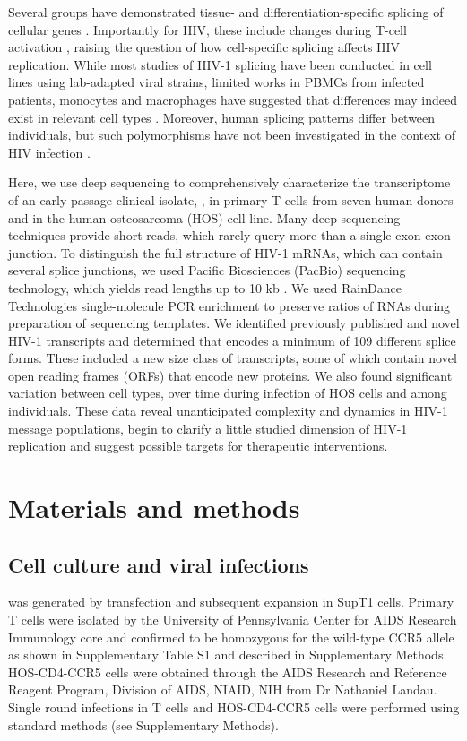 \documentclass[../sherrill-Mix_thesis.tex]{subfiles}
\begin{document}
Several groups have demonstrated tissue- and differentiation-specific splicing of cellular genes \citep{Wang2008,Grabowski2011,Llorian2011}. Importantly for HIV, these include changes during T-cell activation \citep{Ip2007,Topp2008}, raising the question of how cell-specific splicing affects HIV replication. While most studies of HIV-1 splicing have been conducted in cell lines using lab-adapted viral strains, limited works in PBMCs from infected patients, monocytes and macrophages have suggested that differences may indeed exist in relevant cell types \citep{Carrera2010,Saltarelli1996,Sonza2002,Dowling2008}. Moreover, human splicing patterns differ between individuals, but such polymorphisms have not been investigated in the context of HIV infection \citep{Hull2007,Kwan2007}.

Here, we use deep sequencing to comprehensively characterize the transcriptome of an early passage clinical isolate, \hivEight{} \citep{Collman1992}, in primary \cdFour{} T cells from seven human donors and in the human osteosarcoma (HOS) cell line. Many deep sequencing techniques provide short reads, which rarely query more than a single exon-exon junction. To distinguish the full structure of HIV-1 mRNAs, which can contain several splice junctions, we used Pacific Biosciences (PacBio) sequencing technology, which yields read lengths up to 10 kb \citep{Eid2009}. We used RainDance Technologies single-molecule PCR enrichment to preserve ratios of RNAs during preparation of sequencing templates. We identified previously published and novel HIV-1 transcripts and determined that \hivEight{} encodes a minimum of 109 different splice forms. These included a new size class of transcripts, some of which contain novel open reading frames (ORFs) that encode new proteins. We also found significant variation between cell types, over time during infection of HOS cells and among individuals. These data reveal unanticipated complexity and dynamics in HIV-1 message populations, begin to clarify a little studied dimension of HIV-1 replication and suggest possible targets for therapeutic interventions. 

\section{Materials and methods}
\subsection{Cell culture and viral infections}
\hivEight{} was generated by transfection and subsequent expansion in SupT1 cells. Primary T cells were isolated by the University of Pennsylvania Center for AIDS Research Immunology core and confirmed to be homozygous for the wild-type CCR5 allele as shown in Supplementary Table S1 and described in Supplementary Methods. HOS-CD4-CCR5 cells \citep{Deng1996,Landau1992} were obtained through the AIDS Research and Reference Reagent Program, Division of AIDS, NIAID, NIH from Dr Nathaniel Landau. Single round infections in T cells and HOS-CD4-CCR5 cells were performed using standard methods (see Supplementary Methods). 
\end{document}
